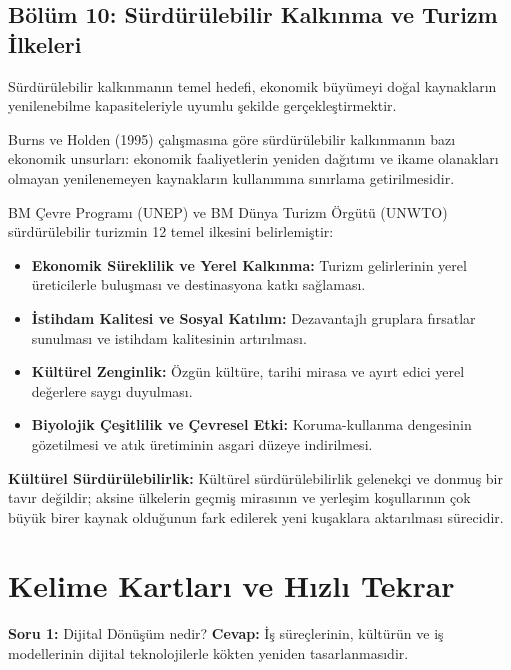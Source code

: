 \documentclass[11pt,a4paper,openany]{book}
\begin{document}
\needspace{9cm}
\section{Bölüm 10: Sürdürülebilir Kalkınma ve Turizm İlkeleri}
Sürdürülebilir kalkınmanın temel hedefi, ekonomik büyümeyi doğal kaynakların yenilenebilme kapasiteleriyle uyumlu şekilde gerçekleştirmektir.

Burns ve Holden (1995) çalışmasına göre sürdürülebilir kalkınmanın bazı ekonomik unsurları: ekonomik faaliyetlerin yeniden dağıtımı ve ikame olanakları olmayan yenilenemeyen kaynakların kullanımına sınırlama getirilmesidir.

BM Çevre Programı (UNEP) ve BM Dünya Turizm Örgütü (UNWTO) sürdürülebilir turizmin 12 temel ilkesini belirlemiştir:
\begin{itemize}
    \item \textbf{Ekonomik Süreklilik ve Yerel Kalkınma:} Turizm gelirlerinin yerel üreticilerle buluşması ve destinasyona katkı sağlaması.
    \item \textbf{İstihdam Kalitesi ve Sosyal Katılım:} Dezavantajlı gruplara fırsatlar sunulması ve istihdam kalitesinin artırılması.
    \item \textbf{Kültürel Zenginlik:} Özgün kültüre, tarihi mirasa ve ayırt edici yerel değerlere saygı duyulması.
    \item \textbf{Biyolojik Çeşitlilik ve Çevresel Etki:} Koruma-kullanma dengesinin gözetilmesi ve atık üretiminin asgari düzeye indirilmesi.
\end{itemize}

\textbf{Kültürel Sürdürülebilirlik:} Kültürel sürdürülebilirlik gelenekçi ve donmuş bir tavır değildir; aksine ülkelerin geçmiş mirasının ve yerleşim koşullarının çok büyük birer kaynak olduğunun fark edilerek yeni kuşaklara aktarılması sürecidir.

\newpage
\chapter{Kelime Kartları ve Hızlı Tekrar}

\needspace{3.5cm}
\begin{tcolorbox}[colback=white, colframe=secondarycolor!50!black, arc=1.2mm, boxrule=0.8pt, top=8pt, bottom=8pt, left=12pt, right=12pt, segmentation style={dashed, secondarycolor!30, line width=0.8pt}]
    \noindent\textbf{\color{red!80!black}\sffamily Soru 1:} Dijital Dönüşüm nedir?
\tcblower
    \noindent\textbf{\color{green!50!black}\sffamily Cevap:} İş süreçlerinin, kültürün ve iş modellerinin dijital teknolojilerle kökten yeniden tasarlanmasıdir.
\end{tcolorbox}
\vspace{6pt}
\end{document}
